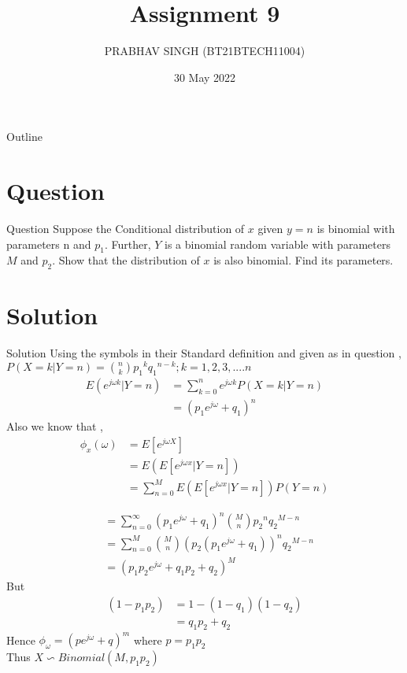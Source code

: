 \documentclass{beamer}
\title{Assignment 9}
\author{PRABHAV SINGH (BT21BTECH11004)}
\date{30 May 2022}
\begin{document}
	
	\begin{frame}
		\titlepage 
	\end{frame}
	
	\logo{}
	
	
	\begin{frame}{Outline}
		\tableofcontents
	\end{frame}
	
	\section{Question}
	\begin{frame}{Question}
	Suppose the Conditional distribution of $ x $ given $ y = n $ is binomial with parameters n and 
	$ p_{1} $. Further, $  Y $ is a binomial random variable with parameters $  M $ and $ p_{2} $. Show that the 
	distribution of $  x  $ is also binomial. Find its parameters.  \\
	\end{frame}
	
	
	\section{Solution}
	\begin{frame}{Solution}
	Using the symbols in their Standard  definition and given as in question ,
	$ 	P(X=k|Y=n) =\binom{n}{k}{p_{1}}^{k}{q_{1}}^{n-k}; k=1,2,3,....n $  \\
	\begin{align}
		E(e^{j{\omega}k}|Y=n)&=\sum_{k=0}^{n}e^{j{\omega}k}P(X=k|Y=n)\\
		&={(p_{1}e^{j{\omega}}+q_{1})}^{n}
	\end{align}
Also we know that ,
\begin{align}
	{\phi}_{x}({\omega})&=E[e^{j{\omega}X}]\\
	&=E(E[e^{j{\omega}x}|Y=n])\\
	&=\sum_{n=0}^{M}E(E[e^{j{\omega}x}|Y=n])P(Y=n)
	\end{align}
\end{frame} 
	
	\begin{frame}
		\begin{align}
			&=\sum_{n=0}^{{\infty}}{(p_{1}e^{j{\omega}}+q_{1})}^{n}\binom{M}{n}{p_{2}}^{n}{q_{2}}^{M-n}\\
			&=\sum_{n=0}^{M}\binom{M}{n}{(p_{2}(p_{1}e^{j{\omega}}+q_{1}))}^{n}{q_{2}}^{M-n}\\
			&= {(p_{1}p_{2}e^{j{\omega}}+q_{1}p_{2}+q_{2})}^{M}
		\end{align}
	But 
	\begin{align}
		(1-p_{1}p_{2} )&= 1- (1-q_{1})(1-q_{2})\\
		&= q_{1}p_{2}+q_{2}
	\end{align}
	Hence 
	{ \textbf{$ {\phi}_{{\omega}}={(pe^{j{\omega}}+q)}^{m} $}} where $ p=p_{1}p_{2} $ \\
	Thus $ \boxed{X \backsim Binomial(M,p_{1}p_{2})} $
\end{frame}
\end{document}
